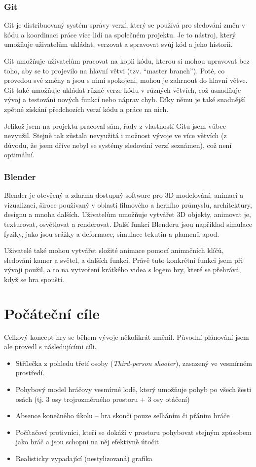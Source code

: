 \documentclass[12pt,a4paper,hidelinks]{article}
\begin{document}
\subsubsection{Git}
Git je distribuovaný systém správy verzí, který se používá pro sledování změn v kódu a koordinaci práce více lidí na společném projektu. Je to nástroj, který umožňuje uživatelům ukládat, verzovat a spravovat svůj kód a jeho historii.

Git umožňuje uživatelům pracovat na kopii kódu, kterou si mohou upravovat bez toho, aby se to projevilo na hlavní větvi (tzv. \enquote{master branch}). Poté, co provedou své změny a jsou s nimi spokojeni, mohou je zahrnout do hlavní větve. Git také umožňuje ukládat různé verze kódu v různých větvích, což usnadňuje vývoj a testování nových funkcí nebo náprav chyb. Díky němu je také snadnější zpětné získání předchozích verzí kódu a práce na nich.

Jelikož jsem na projektu pracoval sám, řady z vlastností Gitu jsem vůbec nevyužil. Stejně tak zůstala nevyužitá i možnost vývoje ve více větvích (z důvodu, že jsem dříve nebyl se systémy sledování verzí seznámen), což není optimální.

\subsubsection{Blender}
Blender je otevřený a zdarma dostupný software pro 3D modelování, animaci a vizualizaci, široce používaný v oblasti filmového a herního průmyslu, architektury, designu a mnoha dalších. Uživatelům umožňuje vytvářet 3D objekty, animovat je, texturovat, osvětlovat a renderovat. Další funkcí Blenderu jsou například simulace fyziky, jako jsou srážky a deformace, simulace tekutin a plamenů apod.

Uživatelé také mohou vytvářet složité animace pomocí animačních klíčů, sledování kamer a světel, a dalších funkcí. Právě tuto konkrétní funkci jsem při vývoji použil, a to na vytvoření krátkého videa s logem hry, které se přehrává, když se hra spouští.
\clearpage

\section{Počáteční cíle}
Celkový koncept hry se během vývoje několikrát změnil. Původní plánování jsem ale provedl s následujícími cíli.
\begin{itemize}
	\item Střílečka z pohledu třetí osoby (\textit{Third-person shooter}), zasazený ve vesmírném prostředí.
	\item Pohybový model hráčovy vesmírné lodě, který umožňuje pohyb po všech šesti osách (tj. 3 osy trojrozměrného prostoru + 3 osy otáčení)
	\item Absence konečného úkolu – hra skončí pouze selháním či přáním hráče
	\item Počítačoví protivníci, kteří se dokáží v prostoru pohybovat stejným způsobem jako hráč a jsou schopni na něj efektivně útočit
	\item Realisticky vypadající (nestylizovaná) grafika
\end{itemize}
\end{document}
